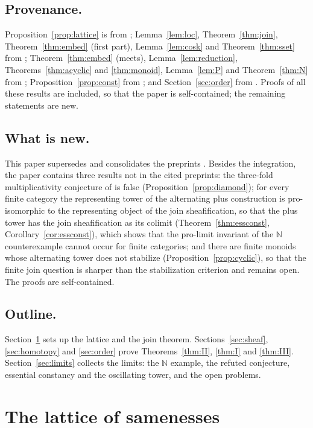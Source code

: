 \documentclass[11pt]{amsart}
\theoremstyle{definition}
\begin{document}
\subsection*{Provenance.}
Proposition~\ref{prop:lattice} is from \cite{Same}; Lemma~\ref{lem:loc},
Theorem~\ref{thm:join}, Theorem~\ref{thm:embed} (first part),
Lemma~\ref{lem:cosk} and Theorem~\ref{thm:sset} from \cite{Postnikov};
Theorem~\ref{thm:embed} (meets), Lemma~\ref{lem:reduction},
Theorems~\ref{thm:acyclic} and \ref{thm:monoid}, Lemma~\ref{lem:P} and
Theorem~\ref{thm:N} from \cite{Topjoin}; Proposition~\ref{prop:const} from
\cite{Infjoin}; and Section~\ref{sec:order} from \cite{EI}. Proofs of all these results are included, so that the paper is
self-contained; the remaining statements are new.

\subsection*{What is new.}
This paper supersedes and consolidates the preprints \cite{Same,Postnikov,Topjoin,EI,Infjoin}.
Besides the integration, the paper contains three results not in the cited
preprints: the three-fold multiplicativity conjecture of \cite[Conj.~6.12]{Topjoin}
is false (Proposition~\ref{prop:diamond}); for every finite category the
representing tower of the alternating plus construction is pro-isomorphic to
the representing object of the join sheafification, so that the plus tower has
the join sheafification as its colimit (Theorem~\ref{thm:essconst},
Corollary~\ref{cor:essconst}), which shows that the pro-limit
invariant of the $\mathbb N$ counterexample cannot occur for finite
categories; and there are finite monoids whose alternating tower does not
stabilize (Proposition~\ref{prop:cyclic}), so that
the finite join question is sharper than the stabilization criterion and remains
open. The proofs are self-contained.

\subsection*{Outline.}
Section~\ref{sec:lattice} sets up the lattice and the join theorem.
Sections~\ref{sec:sheaf}, \ref{sec:homotopy} and \ref{sec:order} prove
Theorems~\ref{thm:II}, \ref{thm:I} and \ref{thm:III}. Section~\ref{sec:limits}
collects the limits: the $\mathbb N$ example, the refuted conjecture, essential
constancy and the oscillating tower, and the open problems.

\section{The lattice of samenesses}\label{sec:lattice}
\end{document}
